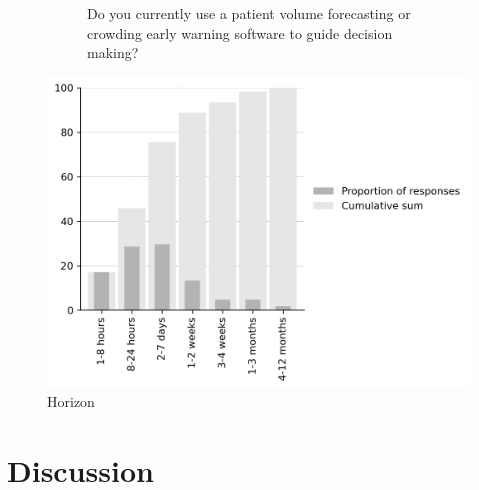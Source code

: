\documentclass{article}
\begin{document}
\begin{figure}[H]
\begin{subfigure}[b]{0.45\textwidth}
        \caption{Do you currently use a patient volume forecasting or crowding early warning software to guide decision making?}
        \label{fig:software_usage}
    \end{subfigure}
    \caption{}
    \label{fig:software_usage}
\end{figure}

\begin{figure}[H]
    \centering
        \includegraphics[width=1.0\textwidth]{../output/plots/horizon}
        \caption{Horizon}
        \label{fig:horizon}
\end{figure}

\section{Discussion}
\lipsum[5]
\end{document}
